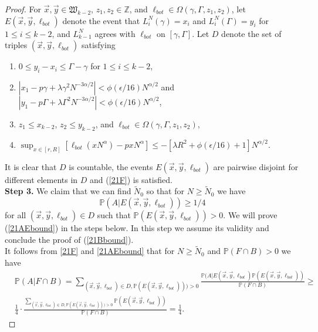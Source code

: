 \begin{proof}
	For $\vec{x},\vec{y}\in\mathfrak{W}_{k-2}$, $z_1,z_2\in\mathbb{Z}$, and $\ell_{bot}\in\Omega(\gamma, \Gamma ,z_1,z_2)$, let $E(\vec{x},\vec{y},\ell_{bot})$ denote the event that $L_i^N(\gamma) = x_i$ and $L_i^N(\Gamma)=y_i$ for $1\leq i\leq k-2$, and $L_{k-1}^N$ agrees with $\ell_{bot}$ on $[\gamma, \Gamma]$. Let $D$ denote the set of triples $(\vec{x},\vec{y},\ell_{bot})$ satisfying
	\begin{enumerate}[label=(\arabic*)]
		\item $0\leq y_i - x_i \leq \Gamma - \gamma$ for $1\leq i\leq k-2$,
		\item $|x_1 - p\gamma + \lambda \gamma^2 N^{-3\alpha/2}| < \phi(\epsilon/16) N^{\alpha/2}$ and $|y_1- p \Gamma  + \lambda \Gamma^2N^{-3\alpha/2}| < \phi(\epsilon/16)N^{\alpha/2}$,
		\item $z_1\leq x_{k-2}$, $z_2\leq y_{k-2}$, and $\ell_{bot} \in \Omega(\gamma , \Gamma,z_1,z_2)$,
		\item $\sup_{x \in [r, R]} [\ell_{bot}(x N^{\alpha}) - pxN^{\alpha} ] \leq -[\lambda R^2 + \phi(\epsilon/16) + 1]N^{\alpha/2}$.
	\end{enumerate}
	It is clear that $D$ is countable, the events $E(\vec{x},\vec{y},\ell_{bot})$ are pairwise disjoint for different elements in $D$ and (\ref{21F}) is satisfied. \\
	
	
	\noindent\textbf{Step 3.} We claim that we can find $\tilde{N}_0$ so that for $N\geq \tilde{N}_0$ we have
	\begin{equation}\label{21AEbound}
		\mathbb{P}(A| E(\vec{x},\vec{y},\ell_{bot})) \geq 1/4
	\end{equation}
	for all $(\vec{x}, \vec{y}, \ell_{bot}) \in D$ such that $\mathbb{P}(E(\vec{x},\vec{y},\ell_{bot})) > 0$. We will prove (\ref{21AEbound}) in the steps below. In this step we assume its validity and conclude the proof of (\ref{21Bbound}). \\
	
	It follows from \eqref{21F} and \eqref{21AEbound} that for $N\geq\tilde{N}_0$ and $\mathbb{P}(F\cap B) > 0$ we have
	\begin{equation*}
		\begin{split}
			&\mathbb{P}(A|F \cap B) = \sum_{(\vec{x},\vec{y},\ell_{bot})\in D, \mathbb{P}(E(\vec{x},\vec{y},\ell_{bot}))) > 0} \frac{\mathbb{P}(A| E(\vec{x},\vec{y},\ell_{bot})\mathbb{P}( E(\vec{x},\vec{y},\ell_{bot}))}{\mathbb{P}(F \cap B)} \geq \\
			& \frac{1}{4}\cdot\frac{\sum_{(\vec{x},\vec{y},\ell_{bot})\in D, \mathbb{P}(E(\vec{x},\vec{y},\ell_{bot}))) > 0} \mathbb{P}( E(\vec{x},\vec{y},\ell_{bot}))}{\mathbb{P}(F\cap B)} = \frac{1}{4}.
		\end{split}
	\end{equation*}
	

\end{proof}
